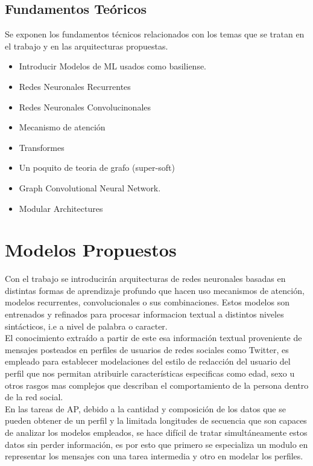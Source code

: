 \documentclass[11pt]{article}
\begin{document}
	\subsection{Fundamentos Teóricos}
		Se exponen los fundamentos técnicos relacionados con  los temas que se tratan en el trabajo y en las arquitecturas propuestas. 
		\begin{itemize}
			\item Introducir Modelos de ML usados como basiliense.
			\item Redes Neuronales Recurrentes
			\item Redes Neuronales Convolucinonales
			\item Mecanismo de atención
			\item Transformes
			\item Un poquito de teoria de grafo (super-soft)
			\item Graph Convolutional Neural Network.
			\item Modular Architectures
		\end{itemize}
	
	
	\section{Modelos Propuestos}
	
	Con el trabajo se introducirán arquitecturas de redes neuronales basadas en distintas formas de aprendizaje profundo que hacen uso mecanismos de atención, modelos recurrentes, convolucionales o sus combinaciones. Estos modelos son entrenados y refinados para procesar informacion textual a distintos niveles sintácticos, i.e a nivel de palabra o caracter. \\El conocimiento extraído a partir de este esa información textual proveniente de mensajes posteados en perfiles de usuarios de redes sociales como Twitter, es empleado para establecer modelaciones del estilo de redacción del usuario del perfil que nos permitan atribuirle características especificas como edad, sexo u otros rasgos mas complejos que describan el comportamiento de la persona dentro de la red social.\\	
	En las tareas de AP, debido a la cantidad y composición de los datos que se pueden obtener de un perfil y la limitada longitudes de secuencia que son capaces de analizar los modelos empleados, se hace difícil de tratar simultáneamente estos datos sin perder información, es por esto que primero se especializa un modulo en representar los mensajes  con una tarea intermedia y otro en modelar los perfiles.\\
	
\end{document}

